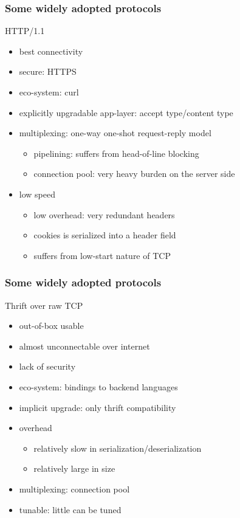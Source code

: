 \documentclass[lualatex]{beamer}
\begin{document}
\begin{frame}
  \frametitle{Some widely adopted protocols}

  \begin{block}{HTTP/1.1}
    \begin{itemize}
    \item best connectivity
    \item secure: HTTPS
    \item eco-system: curl
    \item explicitly upgradable app-layer: accept type/content type
    \item multiplexing: one-way one-shot request-reply model
      \begin{itemize}
      \item pipelining: suffers from head-of-line blocking
      \item connection pool: very heavy burden on the server side
      \end{itemize}
    \item low speed
      \begin{itemize}
      \item low overhead: very redundant headers
      \item cookies is serialized into a header field
      \item suffers from low-start nature of TCP
      \end{itemize}
    \end{itemize}
  \end{block}
\end{frame}

\begin{frame}
  \frametitle{Some widely adopted protocols}

  \begin{block}{Thrift over raw TCP}
    \begin{itemize}
    \item out-of-box usable
    \item almost unconnectable over internet
    \item lack of security
    \item eco-system: bindings to backend languages
    \item implicit upgrade: only thrift compatibility
    \item overhead
      \begin{itemize}
      \item relatively slow in serialization/deserialization
      \item relatively large in size
      \end{itemize}
    \item multiplexing: connection pool
    \item tunable: little can be tuned
    \end{itemize}
  \end{block}
\end{frame}
\end{document}
